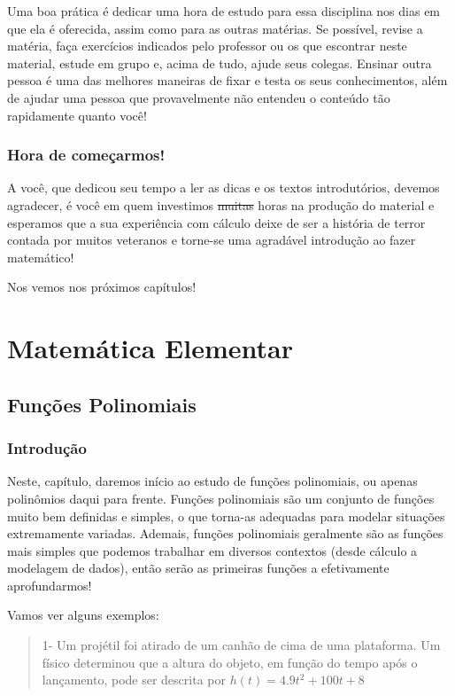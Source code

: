 \documentclass[
  letterpaper,
  DIV=11,
  numbers=noendperiod]{scrreprt}
\begin{document}
Uma boa prática é dedicar uma hora de estudo para essa disciplina nos
dias em que ela é oferecida, assim como para as outras matérias. Se
possível, revise a matéria, faça exercícios indicados pelo professor ou
os que escontrar neste material, estude em grupo e, acima de tudo, ajude
seus colegas. Ensinar outra pessoa é uma das melhores maneiras de fixar
e testa os seus conhecimentos, além de ajudar uma pessoa que
provavelmente não entendeu o conteúdo tão rapidamente quanto você!

\section{Hora de começarmos!}\label{hora-de-comeuxe7armos}

A você, que dedicou seu tempo a ler as dicas e os textos introdutórios,
devemos agradecer, é você em quem investimos \st{muitas} horas na
produção do material e esperamos que a sua experiência com cálculo deixe
de ser a história de terror contada por muitos veteranos e torne-se uma
agradável introdução ao fazer matemático!

Nos vemos nos próximos capítulos! 🤩

\part{Matemática Elementar}

\chapter{Funções Polinomiais}\label{funuxe7uxf5es-polinomiais}

\section{Introdução}\label{introduuxe7uxe3o-1}

Neste, capítulo, daremos início ao estudo de funções polinomiais, ou
apenas polinômios daqui para frente. Funções polinomiais são um conjunto
de funções muito bem definidas e simples, o que torna-as adequadas para
modelar situações extremamente variadas. Ademais, funções polinomiais
geralmente são as funções mais simples que podemos trabalhar em diversos
contextos (desde cálculo a modelagem de dados), então serão as primeiras
funções a efetivamente aprofundarmos!

Vamos ver alguns exemplos:

\begin{quote}
1- Um projétil foi atirado de um canhão de cima de uma plataforma. Um
físico determinou que a altura do objeto, em função do tempo após o
lançamento, pode ser descrita por \(h(t) = 4.9t^2+100t+8\)
\end{quote}
\end{document}
